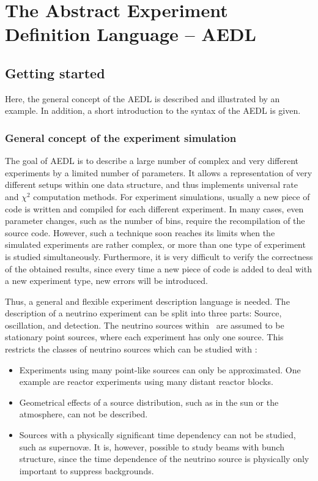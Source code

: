 
\part{The Abstract Experiment Definition Language -- AEDL}
\label{part:2}

\chapter{Getting started}

Here, the general concept of the AEDL is described and illustrated by an example. In addition, a short introduction to the syntax of the AEDL is given.

\section{General concept of the experiment simulation}

The goal of AEDL is to describe a large number of complex and very 
different experiments by a limited number of parameters. It allows a
representation of very different setups within one data structure, and thus implements universal rate and $\chi^2$ computation methods. For experiment simulations, usually a new piece of code is written and compiled
for each different experiment. In many cases, even parameter changes, such as
the number of bins, require the recompilation of the source code. 
However, such a technique soon reaches its limits when the simulated experiments are rather complex, or more than one type of experiment is studied simultaneously. Furthermore, it is very difficult to verify the correctness of the obtained results, since every time a new piece of code is added to 
deal with a new experiment type, new errors will be introduced.

Thus, a general and flexible experiment description language is needed.  
The description of a neutrino experiment can be split into three parts: Source, oscillation, and detection. The neutrino sources within \GLOBES\ 
are assumed to be stationary point sources, where each experiment has only 
one source. This restricts the classes of neutrino sources which can be studied with \GLOBES :
\begin{itemize}
\item
 Experiments using many point-like sources can only be approximated. One example are reactor experiments using many distant reactor blocks.
\item
 Geometrical effects of a source distribution, such as in the sun or the atmosphere, can not be described.
\item
 Sources with a physically significant time dependency  can not be studied, such as  supernov\ae. It is, however, possible
to study beams with bunch structure, since the time dependence of the
neutrino source is physically only important to suppress backgrounds. 
\end{itemize}


